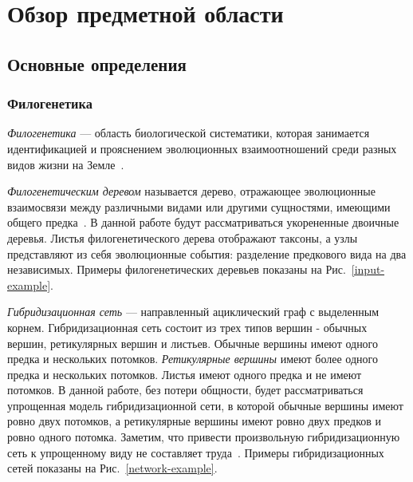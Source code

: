 \FloatBarrier
\chapter{Обзор предметной области}

\FloatBarrier
\section{Основные определения}

\subsection{Филогенетика}

\emph{Филогенетика} --- область биологической систематики, которая занимается идентификацией и прояснением эволюционных взаимоотношений среди разных видов жизни на Земле~\cite{wiki:phylogenetics}.

\emph{Филогенетическим деревом} называется дерево, отражающее эволюционные взаимосвязи между различными видами или другими сущностями, имеющими общего предка~\cite{wiki:phylogenetic-tree}.
В данной работе будут рассматриваться укорененные двоичные деревья. Листья филогенетического дерева отображают таксоны, а узлы представляют из себя эволюционные события: разделение предкового вида на два независимых.
Примеры филогенетических деревьев показаны на Рис.~\ref{input-example}.

\emph{Гибридизационная сеть} --- направленный ациклический граф с выделенным корнем.
Гибридизационная сеть состоит из трех типов вершин - обычных вершин, ретикулярных вершин и листьев.
Обычные вершины имеют одного предка и нескольких потомков.
\emph{Ретикулярные вершины} имеют более одного предка и нескольких потомков.
Листья имеют одного предка и не имеют потомков.
В данной работе, без потери общности, будет рассматриваться упрощенная модель гибридизационной сети, в которой обычные вершины имеют ровно двух потомков, а ретикулярные вершины имеют ровно двух предков и ровно одного потомка. 
Заметим, что привести произвольную гибридизационную сеть к упрощенному виду не составляет труда~\cite{wu2010close}.
Примеры гибридизационных сетей показаны на Рис.~\ref{network-example}.

